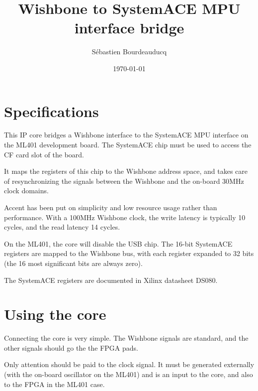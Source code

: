 \documentclass[a4paper,11pt]{article}
\title{Wishbone to SystemACE MPU interface bridge}
\author{S\'ebastien Bourdeauducq}
\date{\today}
\begin{document}
\setlength{\parindent}{0pt}
\setlength{\parskip}{5pt}
\maketitle{}
\section{Specifications}
This IP core bridges a Wishbone interface to the SystemACE MPU interface on the ML401 development board. The SystemACE chip must be used to access the CF card slot of the board.

It maps the registers of this chip to the Wishbone address space, and takes care of resynchronizing the signals between the Wishbone and the on-board 30MHz clock domains.

Accent has been put on simplicity and low resource usage rather than performance. With a 100MHz Wishbone clock, the write latency is typically 10 cycles, and the read latency 14 cycles.

On the ML401, the core will disable the USB chip. The 16-bit SystemACE registers are mapped to the Wishbone bus, with each register expanded to 32 bits (the 16 most significant bits are always zero).

The SystemACE registers are documented in Xilinx datasheet DS080.

\section{Using the core}
Connecting the core is very simple. The Wishbone signals are standard, and the other signals should go the the FPGA pads.

Only attention should be paid to the clock signal. It must be generated externally (with the on-board oscillator on the ML401) and is an input to the core, and also to the FPGA in the ML401 case.
\end{document}
